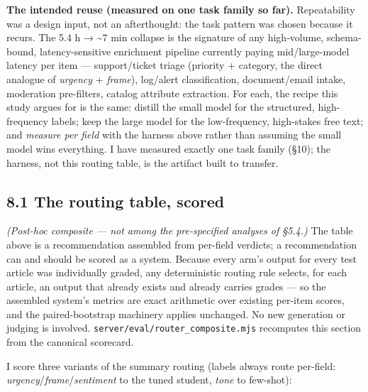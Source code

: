 \documentclass[11pt]{article}
\begin{document}
\textbf{The intended reuse (measured on one task family so far).}
Repeatability was a design input, not an afterthought: the task pattern
was chosen because it recurs. The 5.4 h → \textasciitilde7 min collapse
is the signature of any high-volume, schema-bound, latency-sensitive
enrichment pipeline currently paying mid/large-model latency per item
--- support/ticket triage (priority + category, the direct analogue of
\emph{urgency} + \emph{frame}), log/alert classification, document/email
intake, moderation pre-filters, catalog attribute extraction. For each,
the recipe this study argues for is the same: distill the small model
for the structured, high-frequency labels; keep the large model for the
low-frequency, high-stakes free text; and \emph{measure per field} with
the harness above rather than assuming the small model wins everything.
I have measured exactly one task family (§10); the harness, not this
routing table, is the artifact built to transfer.

\subsection{8.1 The routing table,
scored}\label{the-routing-table-scored}

\emph{(Post-hoc composite --- not among the pre-specified analyses of
§5.4.)} The table above is a recommendation assembled from per-field
verdicts; a recommendation can and should be scored as a system. Because
every arm's output for every test article was individually graded, any
deterministic routing rule selects, for each article, an output that
already exists and already carries grades --- so the assembled system's
metrics are exact arithmetic over existing per-item scores, and the
paired-bootstrap machinery applies unchanged. No new generation or
judging is involved. \texttt{server/eval/router\_composite.mjs}
recomputes this section from the canonical scorecard.

I score three variants of the summary routing (labels always route
per-field: \emph{urgency}/\emph{frame}/\emph{sentiment} to the tuned
student, \emph{tone} to few-shot):
\end{document}
